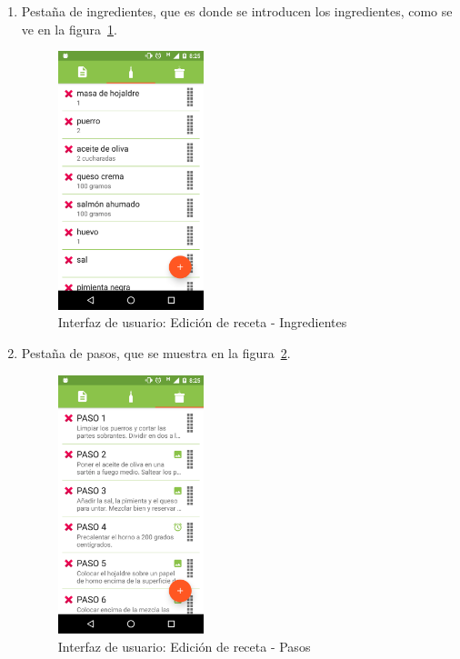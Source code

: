 \begin{enumerate}
\item Pestaña de ingredientes, que es donde se introducen los ingredientes, como
  se ve en la figura~\ref{fig:captura_22}.
  
\begin{figure}[htbp]
  \centering
  \includegraphics[width=0.4\textwidth]{cap5/img/captura_22}
  \caption{Interfaz de usuario: Edición de receta - Ingredientes}
  \label{fig:captura_22}
\end{figure}

\item Pestaña de pasos, que se muestra en la figura~\ref{fig:captura_24}.
  
\begin{figure}[htbp]
  \centering
  \includegraphics[width=0.4\textwidth]{cap5/img/captura_24}
  \caption{Interfaz de usuario: Edición de receta - Pasos}
  \label{fig:captura_24}
\end{figure}

\end{enumerate}

